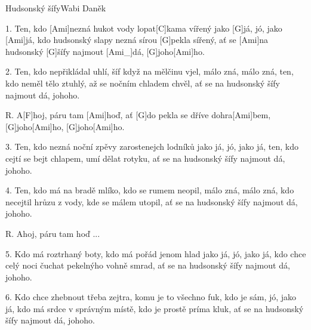 \begin{song}{Hudsonský šífy}{Wabi Daněk}

\begin{xverse}{1. }
Ten, kdo [Ami]nezná hukot vody lopat[C]kama vířený
jako [G]já, jó, jako [Ami]já,
kdo hudsonský slapy nezná sírou [G]pekla sířený,
ať se [Ami]na hudsonský [G]{}šífy najmout [Ami_]{dá}, [G]joho[Ami]ho.
\end{xverse}

\begin{xverse}{2. }
Ten, kdo nepřikládal uhlí, šíf když na mělčinu vjel,
málo zná, málo zná,
ten, kdo neměl tělo ztuhlý, až se nočním chladem chvěl,
ať se na hudsonský šífy najmout dá, johoho.
\end{xverse}

\begin{xverse}{R. }
A[F]hoj, páru tam [Ami]hoď,
ať [G]do pekla se dříve dohra[Ami]bem,
[G]joho[Ami]ho,  [G]joho[Ami]ho.
\end{xverse}

\begin{xverse}{3. }
Ten, kdo nezná noční zpěvy zarostenejch lodníků
jako já, jó, jako já,
ten, kdo cejtí se bejt chlapem, umí dělat rotyku,
ať se na hudsonský šífy najmout dá, johoho.
\end{xverse}

\begin{xverse}{4. }
Ten, kdo má na bradě mlíko, kdo se rumem neopil,
málo zná, málo zná,
kdo necejtil hrůzu z vody, kde se málem utopil,
ať se na hudsonský šífy najmout dá, johoho.
\end{xverse}

\begin{xverse}{R. }
Ahoj, páru tam hoď ...
\end{xverse}

\begin{xverse}{5. }
Kdo má roztrhaný boty, kdo má pořád jenom hlad
jako já, jó, jako já,
kdo chce celý noci čuchat pekelnýho vohně smrad,
ať se na hudsonský šífy najmout dá, johoho.
\end{xverse}

\begin{xverse}{6. }
Kdo chce zhebnout třeba zejtra, komu je to všechno fuk,
kdo je sám, jó, jako já,
kdo má srdce v správným místě, kdo je prostě príma kluk,
ať se na hudsonský šífy najmout dá, johoho.
\end{xverse}

\end{song}

